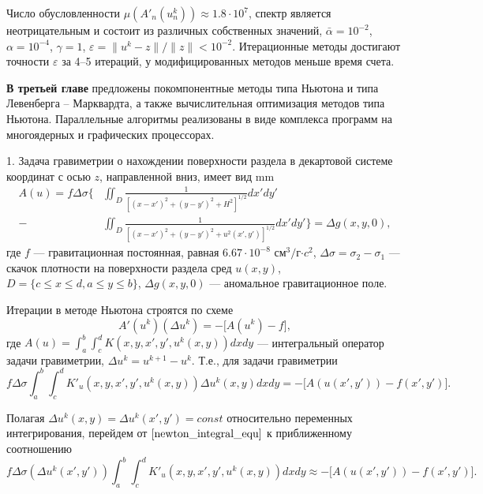 \documentclass[%
autoref,     %
href,        %
facsimile,   %
colorlinks,  %
]{disser}
\newtheorem{remark}{Замечание}
\begin{document}
Число обусловленности $\mu(A'_n(u_n^k))\approx 1.8\cdot 10^7$, спектр является неотрицательным и состоит из различных собственных значений, $\bar\alpha=10^{-2}$, $\alpha = 10^{-4}$, $\gamma=1$, $\varepsilon =\|u^k-z\|/\|z\| < 10^{-2}$. Итерационные методы достигают точности $\varepsilon$ за 4--5 итераций, у модифицированных методов меньше время счета.


\textbf{В третьей главе} предложены покомпонентные методы типа Ньютона и типа Левенберга -- Марквардта, а также вычислительная оптимизация методов типа Ньютона. Параллельные алгоритмы реализованы в виде комплекса программ на многоядерных и графических процессорах.

1. Задача гравиметрии о нахождении поверхности раздела в декартовой системе координат с осью $z$, направленной вниз, имеет вид
 mm
\begin{equation}\label{equ_grav_2l}
\begin{aligned}
A(u)=f\Delta\sigma \bigg\{ &\iint_{D} \frac{1}{[(x-x')^2+(y-y')^2+H^2]^{1/2}}dx'dy' \\
- &\iint_{D} \frac{1}{[(x-x')^2+(y-y')^2+u^2(x',y')]^{1/2}}dx'dy'\bigg\}=\Delta g(x,y,0),
\end{aligned} 
\end{equation}
	где $f$ --- гравитационная постоянная, равная $6.67\cdot10^{-8}$ см$^3/$г$\cdot c^2$, $\Delta\sigma=\sigma_2-\sigma_1$ --- скачок плотности на поверхности раздела сред $u(x,y)$, $D=\{c\leqslant x \leqslant d, a\leqslant y \leqslant b\}$, $\Delta g(x,y,0)$ --- аномальное гравитационное поле.%
	
	Итерации в методе Ньютона строятся по схеме
$$A'(u^k)(\Delta u^k)=-\big[A(u^k)-f\big],$$ где $A(u)=\int_{a}^{b}\int_{c}^{d}K(x,y, x',y',u^k(x,y))dxdy$ --- интегральный оператор задачи гравиметрии, $\Delta u^k=u^{k+1}-u^k$.
Т.е., для задачи гравиметрии
\begin{equation}\label{newton_integral_equ}
	f\Delta\sigma\int_{a}^{b}\int_{c}^{d}K'_u(x,y, x',y',u^k(x,y))\Delta u^k(x,y) dxdy=-\big[A(u(x',y'))-f(x',y')\big].
\end{equation}

Полагая $\Delta u^k(x,y)=\Delta u^k(x',y')=const$ относительно переменных интегрирования, перейдем от $\eqref{newton_integral_equ}$ к приближенному соотношению
$$f\Delta\sigma(\Delta u^k(x',y'))\int_{a}^{b}\int_{c}^{d}K'_u(x,y, x',y',u^k(x,y)) dxdy\approx -\big[A(u(x',y'))-f(x',y')\big].$$
\end{document}
